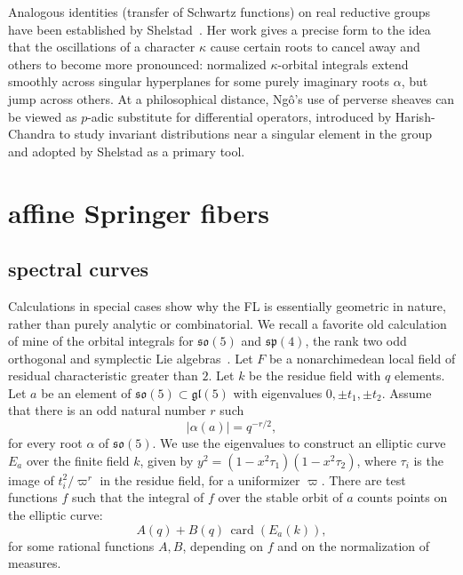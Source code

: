 \documentclass[brochure,english,12pt]{bourbaki}
\def\op#1{{\operatorname{#1}}}
\def\card{\op{card}}
\def\so{\mathfrak{so}}
\def\sp{\mathfrak{sp}}
\def\gl{\mathfrak{gl}}
\begin{document}
Analogous identities (transfer of Schwartz functions)
on real reductive groups have been established by 
Shelstad~\cite{Shelstad:OI}.  Her work gives a precise form to the
 idea that the oscillations of a character
$\kappa$ cause certain roots to cancel away and others to become more
pronounced: normalized $\kappa$-orbital integrals extend smoothly
across singular hyperplanes for some purely imaginary roots $\alpha$,
but jump across others.  At a philosophical distance, Ng\^o's use of
perverse sheaves can be viewed as $p$-adic substitute for 
differential operators, introduced by Harish-Chandra to study
invariant distributions near a singular element in the group and
adopted by Shelstad as a primary tool.



\section{affine Springer fibers}

\subsection{spectral curves}

Calculations in special cases show why the FL is
essentially geometric in nature, rather than purely analytic or
combinatorial. We recall a favorite old calculation of mine of the
orbital integrals for $\so(5)$ and $\sp(4)$, the rank two odd
orthogonal and symplectic Lie algebras~\cite{hyperelliptic-curves}.  
Let $F$ be a nonarchimedean
local field of residual characteristic greater than $2$.  Let $k$ be
the residue field with $q$ elements.  Let $a$ be an element of
$\so(5)\subset \gl(5)$ with eigenvalues $0,\pm t_1,\pm t_2$.  Assume
that there is an odd natural number $r$ such
\[
|\alpha(a)| = q^{-r/2},
\]
for every root $\alpha$ of $\so(5)$. 
We use the eigenvalues to construct an elliptic curve $E_a$ over the finite field $k$, given by
$y^2 = (1-x^2\tau_1)(1-x^2\tau_2)$, where $\tau_i$ is the image
of $t_i^2/\varpi^r$ in the residue field, for a uniformizer $\varpi$.  
There are test functions $f$ 
such that the integral of $f$ over the stable orbit
of $a$ counts points on the elliptic curve:
\begin{equation}\label{eqn:elliptic}
A(q) + B(q)\, \card( E_a(k)),
\end{equation}
for some rational functions $A,B$, depending on $f$ and on the normalization of measures.
\end{document}
